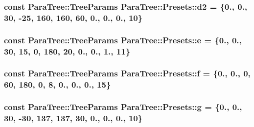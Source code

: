 \subsubsection[{\texorpdfstring{d2}{d2}}]{\setlength{\rightskip}{0pt plus 5cm}const {\bf Para\+Tree\+::\+Tree\+Params} Para\+Tree\+::\+Presets\+::d2 = \{0., 0., 30, -\/25, 160, 160, 60, 0., 0., 0., 10\}\hspace{0.3cm}{\ttfamily [static]}}\hypertarget{struct_para_tree_1_1_presets_ad76e40f8156ae12cbed4c46e368b0da9}{}\label{struct_para_tree_1_1_presets_ad76e40f8156ae12cbed4c46e368b0da9}
\subsubsection[{\texorpdfstring{e}{e}}]{\setlength{\rightskip}{0pt plus 5cm}const {\bf Para\+Tree\+::\+Tree\+Params} Para\+Tree\+::\+Presets\+::e = \{0., 0., 30, 15, 0, 180, 20, 0., 0., 1., 11\}\hspace{0.3cm}{\ttfamily [static]}}\hypertarget{struct_para_tree_1_1_presets_a92fa09db8f19a429c9c7ea1b67a77504}{}\label{struct_para_tree_1_1_presets_a92fa09db8f19a429c9c7ea1b67a77504}
\subsubsection[{\texorpdfstring{f}{f}}]{\setlength{\rightskip}{0pt plus 5cm}const {\bf Para\+Tree\+::\+Tree\+Params} Para\+Tree\+::\+Presets\+::f = \{0., 0., 0, 60, 180, 0, 8, 0., 0., 0., 15\}\hspace{0.3cm}{\ttfamily [static]}}\hypertarget{struct_para_tree_1_1_presets_a0be1972a4f38b31bba5c63fe93fbe0d5}{}\label{struct_para_tree_1_1_presets_a0be1972a4f38b31bba5c63fe93fbe0d5}
\subsubsection[{\texorpdfstring{g}{g}}]{\setlength{\rightskip}{0pt plus 5cm}const {\bf Para\+Tree\+::\+Tree\+Params} Para\+Tree\+::\+Presets\+::g = \{0., 0., 30, -\/30, 137, 137, 30, 0., 0., 0., 10\}\hspace{0.3cm}{\ttfamily [static]}}\hypertarget{struct_para_tree_1_1_presets_aef2261d8e5803e36fdaf1f3c89e02940}{}\label{struct_para_tree_1_1_presets_aef2261d8e5803e36fdaf1f3c89e02940}
